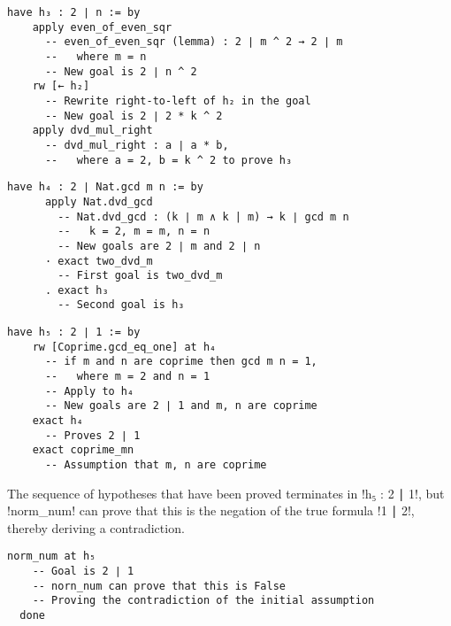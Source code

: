 \begin{Verbatim}[firstnumber=last]
  have h₃ : 2 ∣ n := by
    apply even_of_even_sqr
      -- even_of_even_sqr (lemma) : 2 ∣ m ^ 2 → 2 ∣ m
      --   where m = n
      -- New goal is 2 ∣ n ^ 2
    rw [← h₂]
      -- Rewrite right-to-left of h₂ in the goal
      -- New goal is 2 ∣ 2 * k ^ 2
    apply dvd_mul_right
      -- dvd_mul_right : a ∣ a * b,
      --   where a = 2, b = k ^ 2 to prove h₃
\end{Verbatim}
\vspace*{-1em}
\begin{Verbatim}[firstnumber=last]
    have h₄ : 2 ∣ Nat.gcd m n := by
      apply Nat.dvd_gcd
        -- Nat.dvd_gcd : (k ∣ m ∧ k | m) → k ∣ gcd m n
        --   k = 2, m = m, n = n
        -- New goals are 2 ∣ m and 2 ∣ n
      · exact two_dvd_m
        -- First goal is two_dvd_m
      . exact h₃
        -- Second goal is h₃
\end{Verbatim}
\vspace*{-1em}
\begin{Verbatim}[firstnumber=last]
  have h₅ : 2 ∣ 1 := by
    rw [Coprime.gcd_eq_one] at h₄
      -- if m and n are coprime then gcd m n = 1,
      --   where m = 2 and n = 1
      -- Apply to h₄
      -- New goals are 2 ∣ 1 and m, n are coprime
    exact h₄
      -- Proves 2 ∣ 1
    exact coprime_mn
      -- Assumption that m, n are coprime
\end{Verbatim}


The sequence of hypotheses that have been proved terminates in !h₅ : 2 ∣ 1!, but !norm_num! can prove that this is the negation of the true formula   !1 ∣ 2!, thereby deriving a contradiction.

\begin{Verbatim}[firstnumber=last]
  norm_num at h₅
    -- Goal is 2 ∣ 1
    -- norn_num can prove that this is False
    -- Proving the contradiction of the initial assumption
  done
\end{Verbatim}
